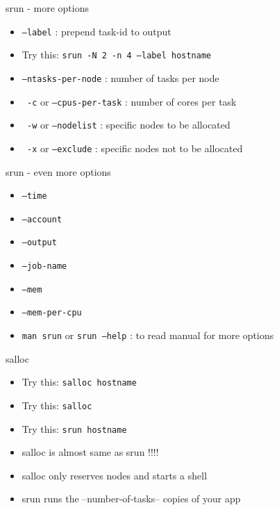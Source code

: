 \documentclass[10pt,compress]{beamer}
\begin{document}
  \begin{frame}{srun - more options}
\begin{itemize} \setlength{\itemsep}{1.5em}%
  \pause
  \item  \texttt{--label} : prepend task-id to output
  \pause
  \item Try this:  \texttt{srun -N 2 -n 4 --label hostname}
  \pause
  \item  \texttt{--ntasks-per-node} : number of tasks per node
    \pause
  \item \texttt{ -c} or \texttt{--cpus-per-task} : number of cores per task
    \pause
  \item \texttt{ -w} or \texttt{--nodelist} : specific nodes to be allocated
    \pause
  \item \texttt{ -x} or \texttt{--exclude} : specific nodes not to be allocated
\end{itemize}
\end{frame}

\begin{frame}{srun - even more options}
\begin{itemize} \setlength{\itemsep}{1.5em}%
  \pause
  \item \texttt{--time}
  \pause  
  \item \texttt{--account}
    \pause
  \item \texttt{--output}
    \pause
  \item \texttt{--job-name}
    \pause
  \item \texttt{--mem}
    \pause
  \item \texttt{--mem-per-cpu}
    \pause
  \item \texttt{man srun} or \texttt{srun --help} :  to read manual for more options  

\end{itemize}
\end{frame}

\begin{frame}{salloc}
\begin{itemize} \setlength{\itemsep}{1.5em}%
  \pause
  \item Try this:  \texttt{salloc hostname}
  \pause
  \item Try this:  \texttt{salloc}
  \pause
   \item Try this: \texttt{srun hostname}
   \pause
  \item salloc is almost same as srun !!!!
  \pause
  \item salloc only reserves nodes and starts a shell
  \pause
  \item srun runs the --number-of-tasks-- copies of your app
\end{itemize}
\end{frame}
\end{document}
